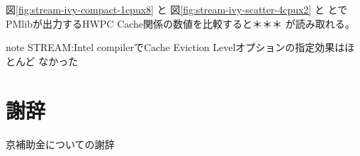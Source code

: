 \documentclass[submit,techrep,noauthor]{ipsj}
\begin{document}
図\ref{fig:stream-ivy-compact-1cpux8} と
図\ref{fig:stream-ivy-scatter-4cpux2} と
とでPMlibが出力するHWPC Cache関係の数値を比較すると＊＊＊
が読み取れる。


{ \color{blue} \par
note STREAM:Intel compilerでCache Eviction Levelオプションの指定効果はほとんど
なかった
} \par


\section{謝辞}
京補助金についての謝辞




%
\end{document}

